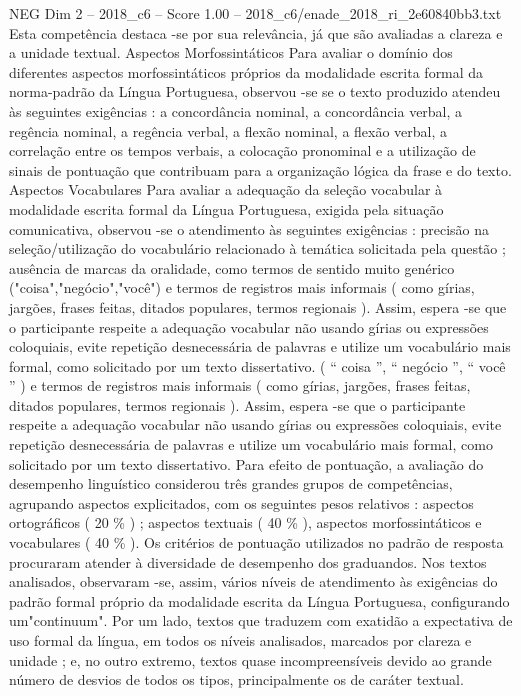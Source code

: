 \begin{textsample}{NEG Dim 2 – 2018\_c6 – Score 1.00 – 2018\_c6/enade\_2018\_ri\_2e60840bb3.txt}
Esta competência destaca -se por sua relevância, já que são avaliadas a clareza e a unidade textual.
Aspectos Morfossintáticos Para avaliar o domínio dos diferentes aspectos morfossintáticos próprios da modalidade escrita formal da norma-padrão da Língua Portuguesa, observou -se se o texto produzido atendeu às seguintes exigências : a concordância nominal, a concordância verbal, a regência nominal, a regência verbal, a flexão nominal, a flexão verbal, a correlação entre os tempos verbais, a colocação pronominal e a utilização de sinais de pontuação que contribuam para a organização lógica da frase e do texto.
Aspectos Vocabulares Para avaliar a adequação da seleção vocabular à modalidade escrita formal da Língua Portuguesa, exigida pela situação comunicativa, observou -se o atendimento às seguintes exigências : precisão na seleção/utilização do vocabulário relacionado à temática solicitada pela questão ; ausência de marcas da oralidade, como termos de sentido muito genérico ("coisa","negócio","você") e termos de registros mais informais ( como gírias, jargões, frases feitas, ditados populares, termos regionais ).
Assim, espera -se que o participante respeite a adequação vocabular não usando gírias ou expressões coloquiais, evite repetição desnecessária de palavras e utilize um vocabulário mais formal, como solicitado por um texto dissertativo. ( “ coisa ”, “ negócio ”, “ você ” ) e termos de registros mais informais ( como gírias, jargões, frases feitas, ditados populares, termos regionais ).
Assim, espera -se que o participante respeite a adequação vocabular não usando gírias ou expressões coloquiais, evite repetição desnecessária de palavras e utilize um vocabulário mais formal, como solicitado por um texto dissertativo.
Para efeito de pontuação, a avaliação do desempenho linguístico considerou três grandes grupos de competências, agrupando aspectos explicitados, com os seguintes pesos relativos : aspectos ortográficos ( 20 \% ) ; aspectos textuais ( 40 \% ), aspectos morfossintáticos e vocabulares ( 40 \% ).
Os critérios de pontuação utilizados no padrão de resposta procuraram atender à diversidade de desempenho dos graduandos.
Nos textos analisados, observaram -se, assim, vários níveis de atendimento às exigências do padrão formal próprio da modalidade escrita da Língua Portuguesa, configurando um"continuum".
Por um lado, textos que traduzem com exatidão a expectativa de uso formal da língua, em todos os níveis analisados, marcados por clareza e unidade ; e, no outro extremo, textos quase incompreensíveis devido ao grande número de desvios de todos os tipos, principalmente os de caráter textual.

\end{textsample}
